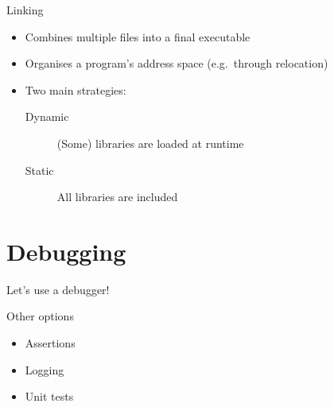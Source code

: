 \begin{frame}{Linking}
    \begin{itemize}
        \item Combines multiple files into a final executable
        \item Organises a program's address space (e.g.\ through relocation)
        \item Two main strategies:
              \begin{description}
                  \item[Dynamic] (Some) libraries are loaded at runtime
                  \item[Static]  All libraries are included
              \end{description}
    \end{itemize}
\end{frame}

\section{Debugging}

\begin{frame}
    \vfill
    \begin{center}
        {\Large%
         Let's use a debugger!}
    \end{center}
    \vfill
\end{frame}

\begin{frame}{Other options}
    \begin{itemize}
        \item Assertions
        \item Logging
        \item Unit tests
    \end{itemize}
\end{frame}



